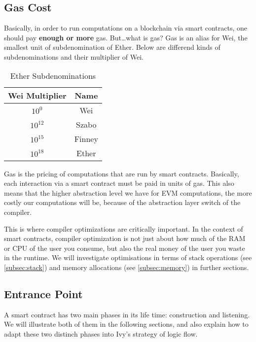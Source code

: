 \documentclass{article}
\begin{document}
\subsection{Gas Cost}
\par Basically, in order to run computations on a blockchain via smart contracts, one should pay \textbf{enough or more} gas. But\ldots what is gas? Gas is an alias for Wei, the smallest unit of subdenomination of Ether. Below are differend kinds of subdenominations and their multiplier of Wei.

\begin{table}[h]
  \centering
  \begin{tabular}{|c|c|}
    \hline
    \textbf{Wei Multiplier} & \textbf{Name} \\
    \hline
    $ 10^0 $ & Wei \\
    \hline
    $ 10^12 $ & Szabo \\
    \hline
    $ 10^15 $ & Finney \\
    \hline
    $ 10^18 $ & Ether \\
    \hline
  \end{tabular}
  \caption{Ether Subdenominations}
  \label{tab:ether_subdenominations}
\end{table}
\par Gas is the pricing of computations that are run by smart contracts. Basically, each interaction via a smart contract must be paid in units of gas. This also means that the higher abstraction level we have for EVM computations, the more costly our computations will be, because of the abstraction layer switch of the compiler.
\newpage
\par This is where compiler optimizations are critically important. In the context of smart contracts, compiler optimization is not just about how much of the RAM or CPU of the user you consume, but also the real money of the user you waste in the runtime. We will investigate optimisations in terms of stack operations (see \ref{subsec:stack}) and memory allocations (see \ref{subsec:memory}) in further sections.

\subsection{Entrance Point}
\par A smart contract has two main phases in its life time: construction and listening. We will illustrate both of them in the following sections, and also explain how to adapt these two distinch phases into Ivy's strategy of logic flow.
\end{document}
